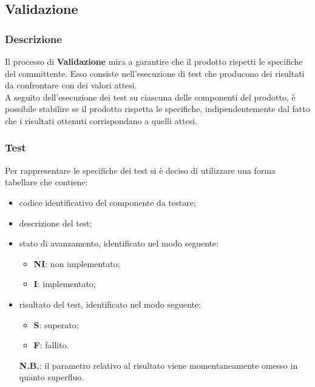 		\subsection{Validazione}
		\subsubsection{Descrizione}
		Il processo di \textbf{Validazione} mira a garantire che il prodotto rispetti le specifiche del committente. Esso consiste nell'esecuzione di test che producono dei risultati da confrontare con dei valori attesi.
		\\
		A seguito dell'esecuzione dei test su ciascuna delle componenti del prodotto, è possibile stabilire se il prodotto rispetta le specifiche, indipendentemente dal fatto che i risultati ottenuti corrispondano a quelli attesi.
	
		\subsubsection{Test}
		Per rappresentare le specifiche dei test si è deciso di utilizzare una forma tabellare che contiene:
				\begin{itemize}
					\item codice identificativo del componente da testare;
					\item descrizione del test;
					\item stato di avanzamento, identificato nel modo seguente:
						\begin{itemize}
							\item \textbf{NI}: non implementato;
							\item \textbf{I}: implementato;
						\end{itemize}
					\item risultato del test, identificato nel modo seguente:
						\begin{itemize}
							\item \textbf{S}: superato;
							\item \textbf{F}: fallito.
						\end{itemize}
						\textbf{N.B.}: il parametro relativo al risultato viene momentaneamente omesso in quanto superfluo.						 
				\end{itemize}		
		

